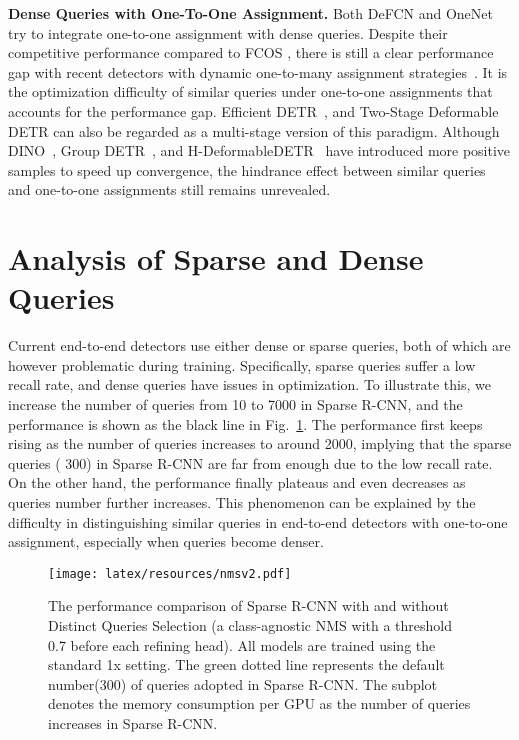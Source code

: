 \documentclass[10pt,twocolumn,letterpaper]{article}
\begin{document}
\noindent\textbf{Dense Queries with One-To-One Assignment.} Both DeFCN \cite{wang2021end} and OneNet \cite{sun2021makes} try to integrate one-to-one assignment with dense queries. Despite their competitive performance compared to FCOS \cite{tian2019fcos}, there is still a clear performance gap with recent detectors with dynamic one-to-many assignment strategies~\cite{kim2020probabilistic, zhu2020autoassign, ge2021ota, feng2021tood, li2022dual}. It is the optimization difficulty of similar queries under one-to-one assignments that accounts for the performance gap. Efficient DETR~\cite{yao2021efficient}, and Two-Stage Deformable DETR \cite{zhu2020deformable} can also be regarded as a multi-stage version of this paradigm. Although DINO~\cite{zhang2022dino}, Group DETR~\cite{chen2022group}, and H-DeformableDETR~\cite{jia2022detrs} have introduced more positive samples to speed up convergence, the hindrance effect between similar queries and one-to-one assignments still remains unrevealed. \section{Analysis of Sparse and Dense Queries}

Current end-to-end detectors use either dense or sparse queries, both of which are however problematic during training. 
Specifically, sparse queries suffer a low recall rate, and dense queries have issues in optimization. To illustrate this, we increase the number of queries from 10 to 7000 in Sparse R-CNN, and the performance is shown as the black line in Fig.~\ref{fig:nms}. The performance first keeps rising as the number of queries increases to around 2000, implying that the sparse queries ( 300) in Sparse R-CNN are far from enough due to the low recall rate.  On the other hand, the performance finally plateaus and even decreases as queries number further increases. This phenomenon can be explained by the difficulty in distinguishing similar queries in end-to-end detectors with one-to-one assignment, especially when queries become denser. 

\begin{figure}[!h]
\centering
\texttt{[image: latex/resources/nmsv2.pdf]}

\caption{The performance comparison of Sparse R-CNN with and without Distinct Queries Selection (a class-agnostic NMS with a threshold 0.7 before each refining head). All models are trained using the standard 1x setting. The green dotted line represents the default number(300) of queries adopted in Sparse R-CNN. The subplot denotes the memory consumption per GPU as the number of queries increases in Sparse R-CNN. 
}
\vspace{-5mm}
\label{fig:nms}
\end{figure}
\label{sec.distincness}
\end{document}
